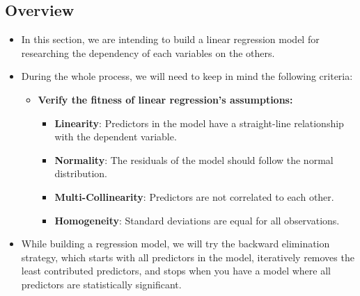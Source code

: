 \documentclass[a4paper]{article}
\begin{document}
\subsection{Overview}
\begin{itemize}
    \item[] In this section, we are intending to build a linear regression model for researching the dependency of each variables on the others.
    
    \item[] During the whole process, we will need to keep in mind the following criteria:
    \begin{itemize}
        \item[] \textbf{Verify the fitness of linear regression's assumptions:}
        \begin{itemize}
            \item[] \textbf{Linearity}: Predictors in the model have a straight-line relationship with the dependent variable. 
            \item[] \textbf{Normality}: The residuals of the model should follow the normal distribution.
            
            \item[] \textbf{Multi-Collinearity}: Predictors are not correlated to each other.
            
            \item[] \textbf{Homogeneity}: Standard deviations are equal for all observations.
        \end{itemize}
    \end{itemize}
    
    \item[] While building a regression model, we will try the backward elimination strategy, which starts with all predictors in the model, iteratively removes the least contributed predictors, and stops when you have a model where all predictors are statistically significant.
\end{itemize}
\end{document}
